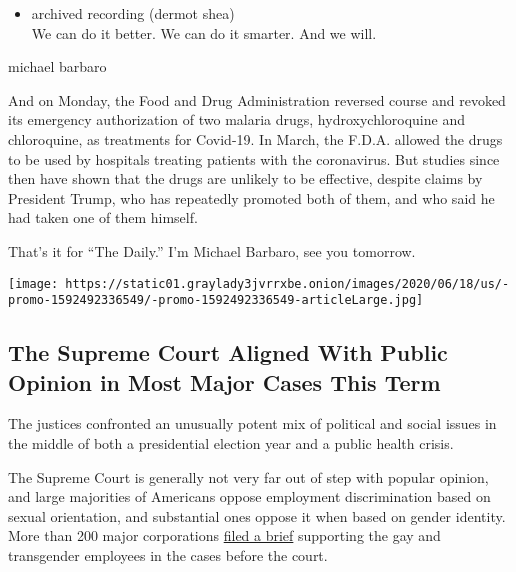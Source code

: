 \begin{itemize}
\tightlist
\item
  archived recording (dermot shea)\\
  We can do it better. We can do it smarter. And we will.
\end{itemize}

michael barbaro

And on Monday, the Food and Drug Administration reversed course and
revoked its emergency authorization of two malaria drugs,
hydroxychloroquine and chloroquine, as treatments for Covid-19. In
March, the F.D.A. allowed the drugs to be used by hospitals treating
patients with the coronavirus. But studies since then have shown that
the drugs are unlikely to be effective, despite claims by President
Trump, who has repeatedly promoted both of them, and who said he had
taken one of them himself.

That's it for ``The Daily.'' I'm Michael Barbaro, see you tomorrow.

\href{https://www.nytimes3xbfgragh.onion/interactive/2020/06/15/us/supreme-court-major-cases-2020.html}{}

\texttt{[image: https://static01.graylady3jvrrxbe.onion/images/2020/06/18/us/-promo-1592492336549/-promo-1592492336549-articleLarge.jpg]}

\hypertarget{the-supreme-court-aligned-with-public-opinion-in-most-major-cases-this-term}{%
\subsection{The Supreme Court Aligned With Public Opinion in Most Major
Cases This
Term}\label{the-supreme-court-aligned-with-public-opinion-in-most-major-cases-this-term}}

The justices confronted an unusually potent mix of political and social
issues in the middle of both a presidential election year and a public
health crisis.

The Supreme Court is generally not very far out of step with popular
opinion, and large majorities of Americans oppose employment
discrimination based on sexual orientation, and substantial ones oppose
it when based on gender identity. More than 200 major corporations
\href{https://www.supremecourt.gov/DocketPDF/17/17-1618/106953/20190703115551379_2019.07.03\%20-\%20Amicus\%20Brief\%20of\%20206\%20Businesses\%20in\%20Support\%20of\%20Employees.pdf}{filed
a brief} supporting the gay and transgender employees in the cases
before the court.

